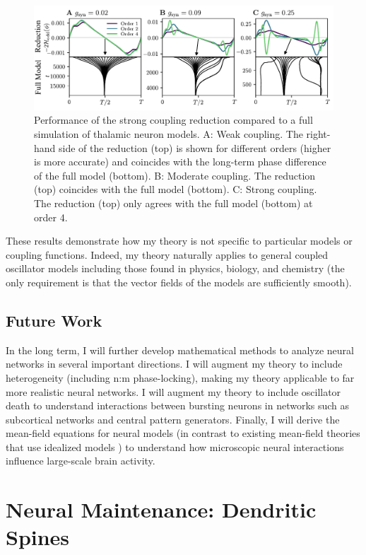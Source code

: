 \documentclass[a4paper,11pt]{article}
\begin{document}
\begin{figure}[ht!]
	\centering
	\includegraphics[width=\textwidth]{figures/thal_h_edited.pdf}
	\caption{Performance of the strong coupling reduction compared to a full simulation of thalamic neuron models. A: Weak coupling. The right-hand side of the reduction (top) is shown for different orders (higher is more accurate) and coincides with the long-term phase difference of the full model (bottom). B: Moderate coupling. The reduction (top) coincides with the full model (bottom). C: Strong coupling. The reduction (top) only agrees with the full model (bottom) at order 4. }\label{fig:thal}
\end{figure}

These results demonstrate how my theory is not specific to particular models or coupling functions. Indeed, my theory naturally applies to general coupled oscillator models including those found in physics, biology, and chemistry (the only requirement is that the vector fields of the models are sufficiently smooth).

\subsection{Future Work}

In the long term, I will further develop mathematical methods to analyze neural networks in several important directions. I will augment my theory to include heterogeneity (including n:m phase-locking), making my theory applicable to far more realistic neural networks. I will augment my theory to include oscillator death to understand interactions between bursting neurons in networks such as subcortical networks and central pattern generators. Finally, I will derive the mean-field equations for neural models (in contrast to existing mean-field theories that use idealized models \cite{ott2008low}) to understand how microscopic neural interactions influence large-scale brain activity.

\section{Neural Maintenance: Dendritic Spines} \label{sec:maintenance}
\end{document}
